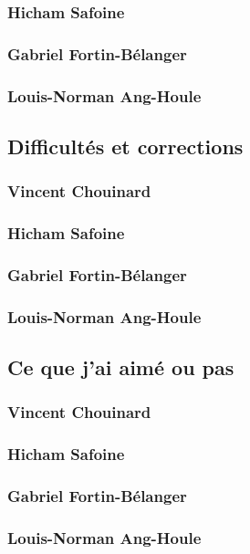 \documentclass[10pt,a4paper,final]{article}
\begin{document}
\begin{spacing}{1.5}
\subsubsection{Hicham Safoine}

\subsubsection{Gabriel Fortin-Bélanger}

\subsubsection{Louis-Norman Ang-Houle}



\subsection{Difficultés et corrections}
\subsubsection{Vincent Chouinard}

\subsubsection{Hicham Safoine}

\subsubsection{Gabriel Fortin-Bélanger}

\subsubsection{Louis-Norman Ang-Houle}


\subsection{Ce que j'ai aimé ou pas}
\subsubsection{Vincent Chouinard}

\subsubsection{Hicham Safoine}

\subsubsection{Gabriel Fortin-Bélanger}

\subsubsection{Louis-Norman Ang-Houle}

\end{spacing}





\end{document}
